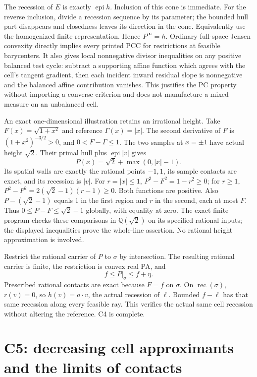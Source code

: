 \documentclass[
  11pt,
]{article}
\begin{document}
The recession of \(E\) is exactly \(\operatorname{epi}h\). Inclusion of
this cone is immediate. For the reverse inclusion, divide a recession
sequence by its parameter; the bounded hull part disappears and
closedness leaves its direction in the cone. Equivalently use the
homogenized finite representation. Hence \(P^\infty=h\). Ordinary
full-space Jensen convexity directly implies every printed PCC for
restrictions at feasible barycenters. It also gives local nonnegative
divisor inequalities on any positive balanced test cycle: subtract a
supporting affine function which agrees with the cell's tangent
gradient, then each incident inward residual slope is nonnegative and
the balanced affine contribution vanishes. This justifies the PC
property without importing a converse criterion and does not manufacture
a mixed measure on an unbalanced cell.

An exact one-dimensional illustration retains an irrational height. Take
\(F(x)=\sqrt{1+x^2}\) and reference \(\Gamma(x)=|x|\). The second
derivative of \(F\) is \((1+x^2)^{-3/2}>0\), and \(0<F-\Gamma\leq1\).
The two samples at \(x=\pm1\) have actual height \(\sqrt2\). Their
primal hull plus \(\operatorname{epi}|v|\) gives
\[ P(x)=\sqrt2+\max(0,|x|-1). \] Its spatial walls are exactly the
rational points \(-1,1\), its sample contacts are exact, and its
recession is \(|v|\). For \(r=|x|\leq1\), \(P^2-F^2=1-r^2\geq0\); for
\(r\geq1\), \(P^2-F^2=2(\sqrt2-1)(r-1)\geq0\). Both functions are
positive. Also \(P-(\sqrt2-1)\) equals \(1\) in the first region and
\(r\) in the second, each at most \(F\). Thus \(0\leq P-F\leq\sqrt2-1\)
globally, with equality at zero. The exact finite program checks these
comparisons in \(\mathbb Q(\sqrt2)\) on its specified rational inputs;
the displayed inequalities prove the whole-line assertion. No rational
height approximation is involved.

Restrict the rational carrier of \(P\) to \(\sigma\) by intersection.
The resulting rational carrier is finite, the restriction is convex real
PA, and \[ f\leq P|_\sigma\leq f+\eta. \] Prescribed rational contacts
are exact because \(F=f\) on \(\sigma\). On
\(\operatorname{rec}(\sigma)\), \(r(v)=0\), so \(h(v)=a\cdot v\), the
actual recession of \(\ell\). Bounded \(f-\ell\) has that same recession
along every feasible ray. This verifies the actual same cell recession
without altering the reference. C4 is complete.

\section{C5: decreasing cell approximants and the limits of
contacts}\label{c5-decreasing-cell-approximants-and-the-limits-of-contacts}
\end{document}
